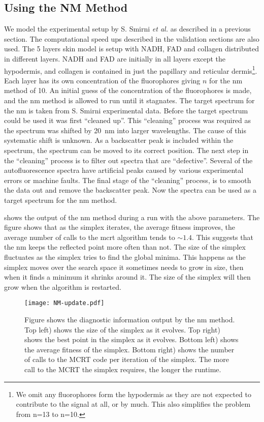 \FloatBarrier
\subsection{Using the NM Method}

We model the experimental setup by S. Smirni \textit{et al.} as described in a previous section.
The computational speed ups described in the validation sections are also used.
The 5 layers skin model is setup with NADH, FAD and collagen distributed in different layers.
NADH and FAD are initially in all layers except the hypodermis, and collagen is contained in just the papillary and reticular dermis\footnote{We omit any fluorophores form the hypodermis as they are not expected to contribute to the signal at all, or by much. This also simplifies the problem from n=13 to n=10.}.
Each layer has its own concentration of the fluorophores giving $n$ for the \gls*{nm} method of 10.
An initial guess of the concentration of the fluorophores is made, and the \gls*{nm} method is allowed to run until it stagnates.
The target spectrum for the \gls*{nm} is taken from S. Smirni experimental data.
Before the target spectrum could be used it was first ``cleaned up''.
This ``cleaning'' process was required as the spectrum was shifted by 20~nm into larger wavelengths.
The cause of this systematic shift is unknown.
As a backscatter peak is included within the spectrum, the spectrum can be moved to its correct position.
The next step in the ``cleaning'' process is to filter out spectra that are ``defective''.
Several of the autofluorescence spectra have artificial peaks caused by various experimental errors or machine faults.
The final stage of the ``cleaning'' process, is to smooth the data out and remove the backscatter peak. 
Now the spectra can be used as a target spectrum for the \gls*{nm} method.

 shows the output of the \gls*{nm} method during a run with the above parameters.
The figure shows that as the simplex iterates, the average fitness improves, the average number of calls to the \gls*{mcrt} algorithm tends to $\sim 1.4$.
This suggests that the \gls*{nm} keeps the reflected point more often than not.
The size of the simplex fluctuates as the simplex tries to find the global minima.
This happens as the simplex moves over the search space it sometimes needs to grow in size, then when it finds a minimum it shrinks around it.
The size of the simplex will then grow when the algorithm is restarted.

\begin{figure}[!htpb]
  \centering
  \texttt{[image: NM-update.pdf]}
  \caption{Figure shows the diagnostic information output by the \gls*{nm} method. Top left) shows the size of the simplex as it evolves. Top right) shows the best point in the simplex as it evolves. Bottom left) shows the average fitness of the simplex. Bottom right) shows the number of calls to the MCRT code per iteration of the simplex. The more call to the MCRT the simplex requires, the longer the runtime.}
  \label{fig:NMupdate}
\end{figure}

